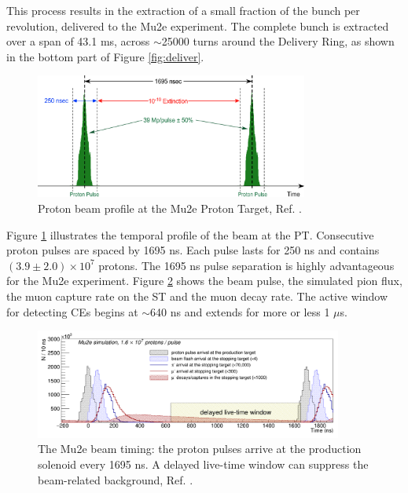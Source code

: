 This process results in the extraction of a small fraction of the bunch per revolution, 
delivered to the Mu2e experiment. The complete bunch is extracted over a span of 43.1 ms, 
across $\sim$25000 turns around the Delivery Ring, as shown in the bottom part of Figure \ref{fig:deliver}.
\begin{figure}[!h]
\centering
\includegraphics[width =0.8\textwidth]{figures/png/Screenshot_20240301_151148.png}
\caption[Proton beam profile.]{Proton beam profile at the Mu2e Proton Target, Ref. \cite{accelerator}.}
\label{fig:beamprofile}
\end{figure}
Figure \ref{fig:beamprofile} illustrates the temporal 
profile of the beam at the PT. Consecutive 
proton pulses are spaced by 1695 ns. Each pulse lasts for 
250 ns and contains $(3.9 \pm 2.0 )\times 10^7$ protons. 
The 1695 ns pulse separation is highly advantageous for 
the Mu2e experiment. Figure \ref{fig:beamwindow} shows the beam pulse, 
the simulated pion flux, the muon capture rate on the ST 
and the muon decay rate. The active window for detecting 
CEs begins at $\sim$640 ns and extends for more or less 1 
$\mu$s. 


\begin{figure}[!h]
\centering
\includegraphics[width =0.9\textwidth]{figures/png/Screenshot_20240301_164649.png}
\caption[The Mu2e beam timing]{The Mu2e beam timing: the proton pulses arrive at the production solenoid every 1695 ns. A delayed live-time window can suppress the beam-related background, Ref. \cite{universe9010054}.}
\label{fig:beamwindow}
\end{figure}
